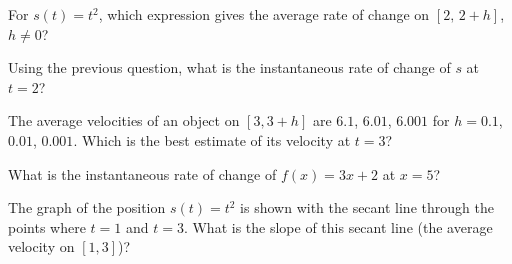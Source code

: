 \begin{exo}{}
For $s(t)=t^2$, which expression gives the average rate of change on $[2,\,2+h]$, $h\neq0$?
\end{exo}
\begin{exo}{}
Using the previous question, what is the instantaneous rate of change of $s$ at $t=2$?
\end{exo}
\begin{exo}{}
The average velocities of an object on $[3,3+h]$ are $6.1$, $6.01$, $6.001$ for $h=0.1$, $0.01$, $0.001$. Which is the best estimate of its velocity at $t=3$?
\end{exo}
\begin{exo}{}
What is the instantaneous rate of change of $f(x)=3x+2$ at $x=5$?
\end{exo}
\begin{exo}[graph]{}
\begin{minipage}{\linewidth}
The graph of the position $s(t)=t^2$ is shown with the secant line through the points where $t=1$ and $t=3$. What is the slope of this secant line (the average velocity on $[1,3]$)?
\begin{center}\end{center}
\end{minipage}
\end{exo}
